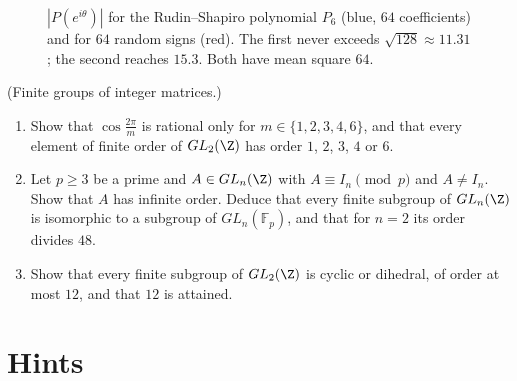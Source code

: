 \begin{figure}[ht]
\centering
{}
\caption{$|P(e^{i\theta})|$ for the Rudin--Shapiro polynomial $P_6$ (blue, $64$ coefficients) and for $64$ random signs (red).
The first never exceeds $\sqrt{128}\approx11.31$; the second reaches $15.3$. Both have mean square $64$.}
\label{fig:rudin}
\end{figure}

\begin{exercise}[$\star\star\star$]\label{pb:glnz}
(Finite groups of integer matrices.)
\begin{enumerate}[label=(\alph*)]
\item Show that $\cos\frac{2\pi}m$ is rational only for $m\in\{1,2,3,4,6\}$, and that every element of finite order of
$GL_2(\Z)$ has order $1$, $2$, $3$, $4$ or $6$.
\item Let $p\ge3$ be a prime and $A\in GL_n(\Z)$ with $A\equiv I_n\pmod p$ and $A\ne I_n$. Show that $A$ has infinite order.
Deduce that every finite subgroup of $GL_n(\Z)$ is isomorphic to a subgroup of $GL_n(\mathbb F_p)$, and that for $n=2$ its
order divides $48$.
\item Show that every finite subgroup of $GL_2(\Z)$ is cyclic or dihedral, of order at most $12$, and that $12$ is attained.
\end{enumerate}
\end{exercise}

\section{Hints}

